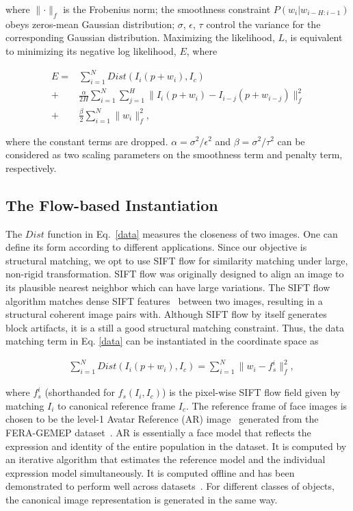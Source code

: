 \documentclass[10pt,journal]{IEEEtran}
\begin{document}
\noindent where $\parallel \cdot \parallel_f$ is the Frobenius norm; the smoothness constraint $P(w_i|w_{i-H:i-1})$ obeys zeros-mean Gaussian distribution; $\sigma$, $\epsilon$, $\tau$ control the variance for the corresponding Gaussian distribution. Maximizing the likelihood, $L$, is equivalent to minimizing its negative log likelihood, $E$, where

\begin{align}
\label{data}
E = &\sum_{i=1}^{N}Dist(I_i(p+w_i),I_c) \\
\label{smooth}
	+ &\frac{\alpha}{2H}\sum_{i=1}^{N}\sum_{j=1}^{H}\parallel{I_i(p+w_i)-I_{i-j}(p+w_{i-j})}\parallel_f^2 \\
\label{penalty}
	+ &\frac{\beta}{2}\sum_{i=1}^{N}\parallel{w_i}\parallel_f^2,
\end{align}


\noindent where the constant terms are dropped. $\alpha=\sigma^2 / \epsilon^2$ and $\beta=\sigma^2 / \tau^2$ can be considered as two scaling parameters on the smoothness term and penalty term, respectively. 

\subsection{\label{sec:model}The Flow-based Instantiation}

The $Dist$ function in Eq.~\ref{data} measures the closeness of two images. One can define its form according to different applications. Since our objective is structural matching, we opt to use SIFT flow \cite{Liu_PAMI11} for similarity matching under large, non-rigid transformation. SIFT flow \cite{Liu_PAMI11} was originally designed to align an image to its plausible nearest neighbor which can have large variations. The SIFT flow algorithm matches dense SIFT features~\cite{SIFT} between two images, resulting in a structural coherent image pairs with. Although SIFT flow by itself generates block artifacts, it is a still a good structural matching constraint. Thus, the data matching term in Eq. \ref{data} can be instantiated in the coordinate space as

\begin{align}
\label{data_sift}
&\sum_{i=1}^{N}Dist(I_i(p+w_i),I_c)=\sum_{i=1}^{N}\parallel{w_i-f_s^i}\parallel_f^2,
\end{align}

\noindent where $f_s^i$ (shorthanded for $f_s(I_i,I_c)$) is the pixel-wise SIFT flow field given by matching $I_i$ to canonical reference frame $I_c$. The reference frame of face images is chosen to be the level-1 Avatar Reference (AR) image~\cite{Yang_SMCB12} generated from the FERA-GEMEP dataset~\cite{Valstar_FERA11}. AR is essentially a face model that reflects the expression and identity of the entire population in the dataset. It is computed by an iterative algorithm that estimates the reference model and the individual expression model simultaneously. It is computed offline and has been demonstrated to perform well across datasets~\cite{Yang_SMCB12}. For different classes of objects, the canonical image representation is generated in the same way.
\end{document}
